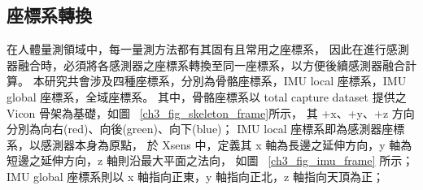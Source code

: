 \subsection{座標系轉換}
在人體量測領域中，每一量測方法都有其固有且常用之座標系，
因此在進行感測器融合時，必須將各感測器之座標系轉換至同一座標系，以方便後續感測器融合計算。
本研究共會涉及四種座標系，分別為骨骼座標系，IMU local 座標系，IMU global 座標系，全域座標系。
其中，骨骼座標系以 total capture dataset 提供之 Vicon 骨架為基礎，如圖 ~\ref{ch3_fig_skeleton_frame}所示，
其 +x、+y、+z 方向分別為向右(red)、向後(green)、向下(blue)；
IMU local 座標系即為感測器座標系，以感測器本身為原點，
於 Xsens 中，定義其 x 軸為長邊之延伸方向，y 軸為短邊之延伸方向，z 軸則沿最大平面之法向，
如圖 ~\ref{ch3_fig_imu_frame} 所示；
IMU global 座標系則以 x 軸指向正東，y 軸指向正北，z 軸指向天頂為正；
